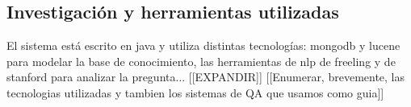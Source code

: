 





\bigskip

\subsection{Investigaci\'on y herramientas utilizadas}

El sistema est\'a escrito en java y utiliza distintas tecnolog\'ias:
mongodb y lucene para modelar la base de conocimiento, las herramientas
de nlp de freeling y de stanford para analizar la pregunta...
[[EXPANDIR]]
[[Enumerar, brevemente, las tecnologias utilizadas y tambien los sistemas de QA que usamos como guia]]

\bigskip
